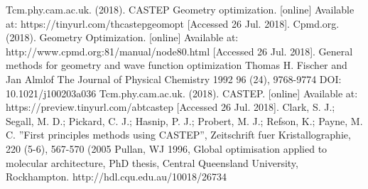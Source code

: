 \documentclass[conference]{IEEEtran}
\begin{document}
\begin{thebibliography}{00}
Tcm.phy.cam.ac.uk. (2018). CASTEP Geometry optimization. [online]
Available at: https://tinyurl.com/thcastepgeomopt
[Accessed 26 Jul. 2018].
Cpmd.org. (2018). Geometry Optimization. [online]
Available at: http://www.cpmd.org:81/manual/node80.html [Accessed 26 Jul. 2018].
General methods for geometry and wave function optimization Thomas H. Fischer and Jan Almlof
The Journal of Physical Chemistry 1992 96 (24), 9768-9774 DOI: 10.1021/j100203a036
Tcm.phy.cam.ac.uk. (2018). CASTEP. [online]
Available at: https://preview.tinyurl.com/abtcastep [Accessed 26 Jul. 2018].
Clark, S. J.; Segall, M. D.; Pickard, C. J.; Hasnip, P. J.; Probert, M. J.; Refson, K.; Payne, M. C.
”First principles methods using CASTEP”, Zeitschrift fuer Kristallographie, 220 (5-6), 567-570 (2005
Pullan, WJ 1996, Global optimisation applied to molecular architecture, 
PhD thesis, Central Queensland University, Rockhampton. http://hdl.cqu.edu.au/10018/26734
\end{thebibliography}
\end{document}
